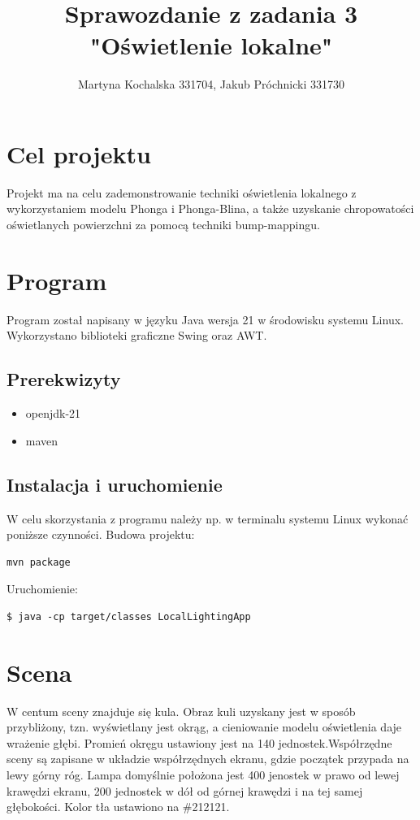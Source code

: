 \documentclass{article}
\begin{document}
\title{
Sprawozdanie z zadania 3 \\
"Oświetlenie lokalne"}
\author{
Martyna Kochalska 331704,
Jakub Próchnicki  331730\\
}

\maketitle
\section{Cel projektu}
Projekt ma na celu zademonstrowanie techniki oświetlenia lokalnego z wykorzystaniem 
modelu Phonga i Phonga-Blina, a także uzyskanie chropowatości oświetlanych powierzchni
za pomocą techniki bump-mappingu.
\section{Program}
Program został napisany w języku Java wersja 21 w środowisku systemu Linux.
Wykorzystano biblioteki graficzne Swing oraz AWT.
\subsection{Prerekwizyty}
\begin{itemize}
    \item openjdk-21
    \item maven
\end{itemize}
\subsection{Instalacja i uruchomienie }
W celu skorzystania z programu należy np. w terminalu systemu Linux wykonać poniższe czynności.
Budowa projektu:
\begin{lstlisting}
mvn package
\end{lstlisting}
Uruchomienie:
\begin{lstlisting}
$ java -cp target/classes LocalLightingApp
\end{lstlisting}

\section{Scena}
W centum sceny znajduje się kula. Obraz kuli uzyskany jest w sposób przybliżony, 
tzn. wyświetlany jest okrąg, a cieniowanie modelu oświetlenia daje wrażenie głębi.
Promień okręgu ustawiony jest na 140 jednostek.Współrzędne sceny są zapisane
w układzie współrzędnych ekranu, gdzie początek przypada na lewy górny róg.
Lampa domyślnie położona jest 400 jenostek w prawo od lewej krawędzi ekranu,
200 jednostek w dół od górnej krawędzi i na tej samej głębokości. Kolor tła ustawiono na \#212121.
\end{document}
